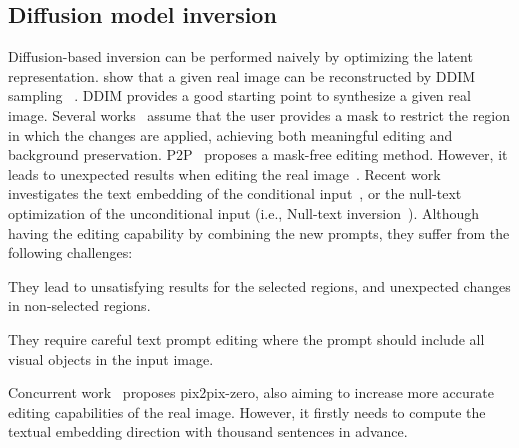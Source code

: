 \documentclass[twocolumn]{svjour3}          \smartqed  \usepackage{graphicx}
\begin{document}
\subsection{Diffusion model inversion}
Diffusion-based inversion can be performed naively by optimizing the latent representation.  \cite{dhariwal2021diffusion} show that a given real image can be reconstructed by DDIM sampling ~\citep{song2020denoising}. DDIM provides a good starting point to synthesize a given real image.  Several works~\citep{avrahami2022blendedlatent, avrahami2022blended,nichol2021glide} assume that the user provides a mask to restrict the region in which the changes are applied, achieving both meaningful editing and background preservation. P2P~\citep{hertz2022prompt} proposes a mask-free editing method. However, it leads to unexpected results when editing the real image~\citep{mokady2022null}.  Recent work investigates the text embedding of the conditional input~\citep{gal2022image},  or the null-text optimization of the unconditional input (i.e., Null-text inversion~\citep{ mokady2022null}).  Although having the editing capability by combining the new prompts,  
they suffer from the following challenges:
   \begin{enumerate*}[label=(\Roman*)]
    \item They lead to unsatisfying results for the selected regions, and unexpected changes in non-selected regions.    
    \item They require careful text prompt editing where the prompt should include all visual objects in the input image.    
 \end{enumerate*}

Concurrent work~\citep{parmar2023zero} proposes pix2pix-zero, also aiming to increase more accurate editing capabilities of the real image. However, it firstly needs to compute the textual embedding direction with thousand sentences in advance. 
\end{document}
